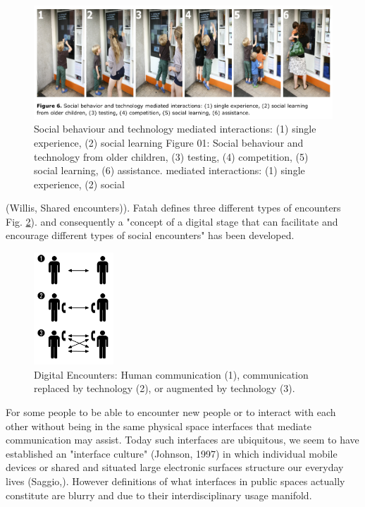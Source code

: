\begin{figure}[h!] 
\centering
\includegraphics[width=12cm]{Illustrations/TechMedBehave.png}
\caption [Technology mediated social behaviour] {Social behaviour and technology mediated interactions: (1) single experience, (2) social learning
Figure 01: Social behaviour and technology
from older children, (3) testing, (4) competition, (5) social learning, (6) assistance.
mediated interactions: (1) single experience, (2) social}
\label{TechMedBehave}
\end{figure}


(Willis, Shared encounters)).
Fatah defines three different types of encounters Fig. \ref{DigitalEncounterFatah}). 
and consequently a "concept of a digital stage that can facilitate and encourage different types of social encounters" has been developed. 


\begin{figure}[h!] 
\centering
\includegraphics[width=3cm]{Illustrations/DigitalEncounterFatah.png}
\caption [Digital Encounter Fatah] {Digital Encounters: Human communication (1), communication replaced by technology (2), or augmented by technology (3).}
\label{DigitalEncounterFatah}
\end{figure}


For some people to be able to encounter new people or to interact with each other without being in the same physical space interfaces that mediate communication may assist.
Today such interfaces are ubiquitous, we seem to have established an "interface culture" (Johnson, 1997) 
in which individual mobile devices or shared and situated large electronic surfaces structure our everyday lives (Saggio,).
However definitions of what interfaces in public spaces actually constitute are blurry and due to their interdisciplinary usage manifold.  

